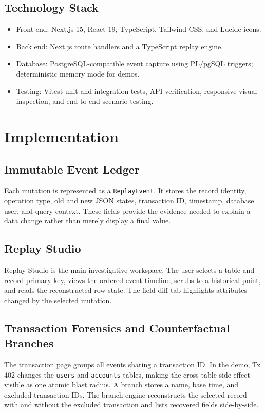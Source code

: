 \documentclass{tietreport}
\begin{document}
\section{Technology Stack}
\begin{itemize}
\item Front end: Next.js 15, React 19, TypeScript, Tailwind CSS, and Lucide icons.
\item Back end: Next.js route handlers and a TypeScript replay engine.
\item Database: PostgreSQL-compatible event capture using PL/pgSQL triggers; deterministic memory mode for demos.
\item Testing: Vitest unit and integration tests, API verification, responsive visual inspection, and end-to-end scenario testing.
\end{itemize}

\chapter{Implementation}
\section{Immutable Event Ledger}
Each mutation is represented as a \texttt{ReplayEvent}. It stores the record identity, operation type, old and new JSON states, transaction ID, timestamp, database user, and query context. These fields provide the evidence needed to explain a data change rather than merely display a final value.

\section{Replay Studio}
Replay Studio is the main investigative workspace. The user selects a table and record primary key, views the ordered event timeline, scrubs to a historical point, and reads the reconstructed row state. The field-diff tab highlights attributes changed by the selected mutation.

\section{Transaction Forensics and Counterfactual Branches}
The transaction page groups all events sharing a transaction ID. In the demo, Tx 402 changes the \texttt{users} and \texttt{accounts} tables, making the cross-table side effect visible as one atomic blast radius. A branch stores a name, base time, and excluded transaction IDs. The branch engine reconstructs the selected record with and without the excluded transaction and lists recovered fields side-by-side.
\end{document}
